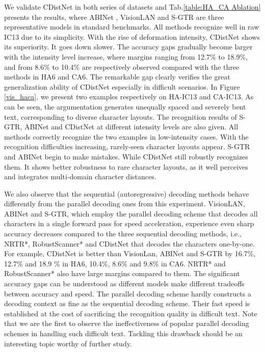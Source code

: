 We validate CDistNet in both series of datasets and Tab.\ref{table:HA_CA Ablation} presents the results, where ABINet \citep{ABInet21CVPR}, VisionLAN \citep{wang2021FTO} and S-GTR \citep{he2021S-GTR} are three representative models in standard benchmarks. All methods recognize well in raw IC13 due to its simplicity. With the rise of deformation intensity, CDistNet shows its superiority. It goes down slower. The accuracy gaps gradually become larger with the intensity level increase, where margins ranging from 12.7\% to 18.9\%, and from 8.6\% to 10.4\% are respectively observed compared with the three methods in HA6 and CA6. The remarkable gap clearly verifies the great generalization ability of CDistNet especially in difficult scenarios. In Figure \ref{vis_haca}, we present two examples respectively on HA-IC13 and CA-IC13. As can be seen, the argumentation generates unequally spaced and severely bent text, corresponding to diverse character layouts. The recognition results of S-GTR, ABINet and CDistNet at different intensity levels are also given. All methods correctly recognize the two examples in low-intensity cases. With the recognition difficulties increasing, rarely-seen character layouts appear. S-GTR and ABINet begin to make mistakes. While CDistNet still robustly recognizes them. It shows better robustness to rare character layouts, as it well perceives and integrates multi-domain character distances.


We also observe that the sequential (autoregressive) decoding methods behave differently from the parallel decoding ones from this experiment. VisionLAN, ABINet and S-GTR, which employ the parallel decoding scheme that decodes all characters in a single forward pass for speed acceleration, experience even sharp accuracy decreases compared to the three sequential decoding methods, i.e., NRTR*, RobustScanner* and CDistNet that decodes the characters one-by-one. For example, CDistNet is better than VisionLan, ABINet and S-GTR by 16.7\%, 12.7\% and 18.9
\% in HA6, 10.4\%, 8.6\% and 9.8\% in CA6. NRTR* and RobustScanner* also have large margins compared to them. The significant accuracy gaps can be understood as different models make different tradeoffs between accuracy and speed. The parallel decoding scheme hardly constructs a decoding context as fine as the sequential decoding scheme. Their fast speed is established at the cost of sacrificing the recognition quality in difficult text. Note that we are the first to observe the ineffectiveness of popular parallel decoding schemes in handling such difficult text. Tackling this drawback should be an interesting topic worthy of further study.


